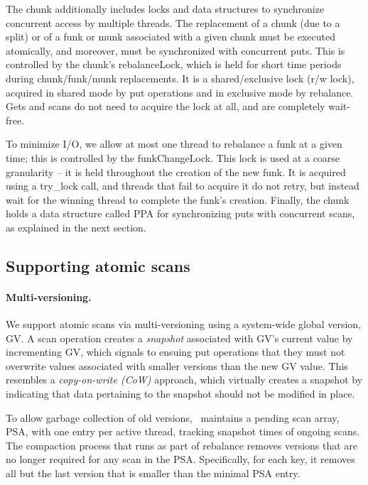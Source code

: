 The chunk additionally includes locks and data structures to synchronize concurrent access by multiple threads.
The replacement of a chunk (due to a split) or of a funk or munk associated with a given chunk 
must be executed atomically, and moreover, must be synchronized with concurrent puts. 
This is controlled by the chunk's rebalanceLock, which is held for short time periods
during chunk/funk/munk replacements.  It is a shared/exclusive lock (r/w lock), acquired in shared mode 
by put operations and in exclusive mode by rebalance. Gets and scans do not need to acquire the lock at all,
and are completely wait-free.

To minimize I/O, we allow at most one thread to rebalance a funk at a given time; this is controlled by 
the  funkChangeLock. This lock is used at a coarse granularity -- it is held throughout the creation of the new funk. 
It is acquired using a try\_lock call, and threads that fail to acquire it do not retry, but instead wait for the winning thread 
to complete the funk's creation.
Finally, the chunk holds a data structure called PPA for synchronizing  puts with concurrent scans, as explained in the next section. 


\subsection{Supporting atomic scans}
\label{ssec:scans}


\paragraph{Multi-versioning.}

We support atomic scans via multi-versioning using a system-wide global version, GV. 
A scan operation creates a \emph{snapshot} associated with GV's current value by incrementing GV, 
which signals to ensuing put operations that they must not overwrite values associated with 
smaller versions than the new GV value.
This resembles a \emph{copy-on-write (CoW)} approach, which virtually creates a snapshot by 
indicating that data pertaining to the snapshot should not be modified in place.  

To allow garbage collection of old versions, \sys\  maintains 
a pending scan array, PSA, with one entry per active thread, tracking snapshot times of ongoing scans.
The compaction process that runs as part of rebalance removes versions that are no longer required for any  
scan in the PSA. Specifically, for each key, it removes all but the last version that is smaller than the minimal
PSA entry. 

